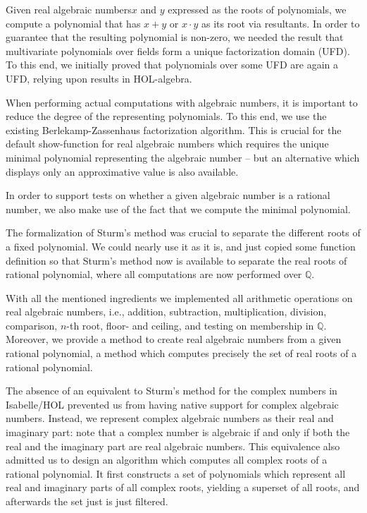 \documentclass[11pt,a4paper]{article}
\newcommand\rats{\mathbb{Q}}
\newcommand\rais{real algebraic numbers\xspace}
\begin{document}
Given \rais $x$ and $y$ expressed as the roots of polynomials,
we compute a polynomial that has $x+y$ or $x \cdot y$ as its root via resultants.
In order to guarantee that the resulting polynomial is non-zero, we needed the result
that multivariate polynomials over fields form a unique factorization domain (UFD).
To this end, we initially proved that polynomials over some UFD are again a UFD, relying
upon results in HOL-algebra. 

When performing actual computations with algebraic numbers, it is important to reduce
the degree of the representing polynomials. To this end, we use the existing
Berlekamp-Zassenhaus factorization algorithm. This is crucial for the default show-function for real 
algebraic numbers which requires the unique minimal polynomial representing the algebraic number --
but an alternative which displays only an approximative value is also available.

In order to support tests on whether a given algebraic number is a rational number, 
we also make use of the fact that we compute the minimal polynomial.

The formalization of Sturm's method \cite{Sturm-AFP} was crucial to separate the different
roots of a fixed polynomial. 
We could nearly use it as it is, and just copied some function definition so
that Sturm's method now is available to separate the real roots of rational polynomial, where
all computations are now performed over $\rats$.

With all the mentioned ingredients we implemented all arithmetic operations on real algebraic
numbers, i.e., addition, subtraction, multiplication, division, comparison, $n$-th root, floor-
and ceiling, and testing on membership in $\rats$. Moreover, we provide a method
to create real algebraic numbers from a given rational polynomial, a method which computes
precisely the set of real roots of a rational polynomial.

\medskip

The absence of an equivalent to Sturm's method for the complex numbers in Isabelle/HOL prevented
us from having native support for complex algebraic numbers. Instead, we represent complex
algebraic numbers as their real and imaginary part: note that a complex number is algebraic if
and only if both the real and the imaginary part are real algebraic numbers.
This equivalence also admitted us to design an algorithm which computes all complex roots
of a rational polynomial. It first constructs a set of polynomials which represent all
real and imaginary parts of all complex roots, yielding a superset of all roots,
and afterwards the set just is just filtered.
\end{document}
